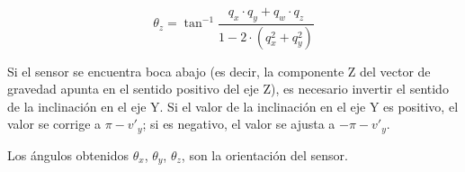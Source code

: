 \begin{equation}
	\theta_z = \tan^{-1}\frac{q_x \cdot q_y + q_w \cdot q_z}{1 - 2 \cdot (q_x^2 + q_y^2)}
	\label{eq:anguloz}
\end{equation}

Si el sensor se encuentra boca abajo (es decir, la componente Z del vector de gravedad apunta en el sentido positivo del eje Z), es necesario invertir el sentido de la inclinación en el eje Y. Si el valor de la inclinación en el eje Y es positivo, el valor se corrige a $\pi - v'_y$; si es negativo, el valor se ajusta a $-\pi - v'_y$.

Los ángulos obtenidos $\theta_x$, $\theta_y$, $\theta_z$, son la orientación del sensor.